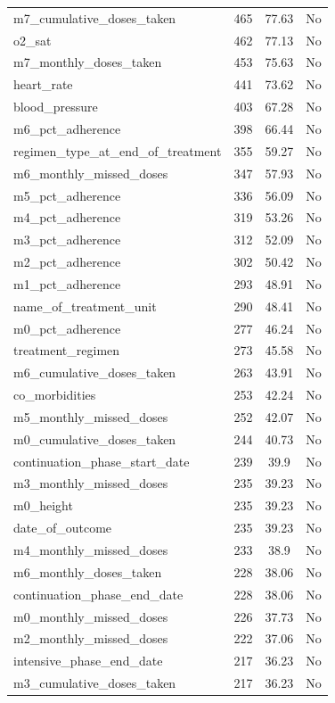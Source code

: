 \begin{longtable}[l]{>{\raggedright\arraybackslash}p{}cc>{\centering\arraybackslash}p{}}
m7\_cumulative\_doses\_taken & 465 & 77.63 & No \\
o2\_sat & 462 & 77.13 & No \\
m7\_monthly\_doses\_taken & 453 & 75.63 & No \\
heart\_rate & 441 & 73.62 & No \\
blood\_pressure & 403 & 67.28 & No \\
m6\_pct\_adherence & 398 & 66.44 & No \\
regimen\_type\_at\_end\_of\_treatment & 355 & 59.27 & No \\
m6\_monthly\_missed\_doses & 347 & 57.93 & No \\
m5\_pct\_adherence & 336 & 56.09 & No \\
m4\_pct\_adherence & 319 & 53.26 & No \\
m3\_pct\_adherence & 312 & 52.09 & No \\
m2\_pct\_adherence & 302 & 50.42 & No \\
m1\_pct\_adherence & 293 & 48.91 & No \\
name\_of\_treatment\_unit & 290 & 48.41 & No \\
m0\_pct\_adherence & 277 & 46.24 & No \\
treatment\_regimen & 273 & 45.58 & No \\
m6\_cumulative\_doses\_taken & 263 & 43.91 & No \\
co\_morbidities & 253 & 42.24 & No \\
m5\_monthly\_missed\_doses & 252 & 42.07 & No \\
m0\_cumulative\_doses\_taken & 244 & 40.73 & No \\
continuation\_phase\_start\_date & 239 & 39.9 & No \\
m3\_monthly\_missed\_doses & 235 & 39.23 & No \\
m0\_height & 235 & 39.23 & No \\
date\_of\_outcome & 235 & 39.23 & No \\
m4\_monthly\_missed\_doses & 233 & 38.9 & No \\
m6\_monthly\_doses\_taken & 228 & 38.06 & No \\
continuation\_phase\_end\_date & 228 & 38.06 & No \\
m0\_monthly\_missed\_doses & 226 & 37.73 & No \\
m2\_monthly\_missed\_doses & 222 & 37.06 & No \\
intensive\_phase\_end\_date & 217 & 36.23 & No \\
m3\_cumulative\_doses\_taken & 217 & 36.23 & No \\

\end{longtable}
